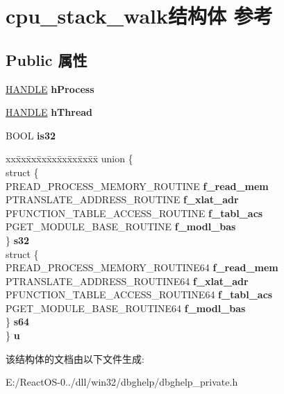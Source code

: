 \hypertarget{structcpu__stack__walk}{}\section{cpu\+\_\+stack\+\_\+walk结构体 参考}
\label{structcpu__stack__walk}
\subsection*{Public 属性}
\begin{DoxyCompactItemize}
\item 
\mbox{\label{structcpu__stack__walk_a3cef9f31d36237260c739c8983b76a48}} 
\hyperlink{interfacevoid}{H\+A\+N\+D\+LE} {\bfseries h\+Process}
\item 
\mbox{\label{structcpu__stack__walk_afe2026d8ae221bf72e8b1f0e31be3b79}} 
\hyperlink{interfacevoid}{H\+A\+N\+D\+LE} {\bfseries h\+Thread}
\item 
\mbox{\label{structcpu__stack__walk_adaa96730dfcb91526c6014dffc41317d}} 
B\+O\+OL {\bfseries is32}
\item 
\mbox{\label{structcpu__stack__walk_a3bf1ecdc96ffb6f53e4769bec6cd9d11}} 
\begin{tabbing}
xx\=xx\=xx\=xx\=xx\=xx\=xx\=xx\=xx\=\kill
union \{\\
\>struct \{\\
\>\>PREAD\_PROCESS\_MEMORY\_ROUTINE {\bfseries f\_read\_mem}\\
\>\>PTRANSLATE\_ADDRESS\_ROUTINE {\bfseries f\_xlat\_adr}\\
\>\>PFUNCTION\_TABLE\_ACCESS\_ROUTINE {\bfseries f\_tabl\_acs}\\
\>\>PGET\_MODULE\_BASE\_ROUTINE {\bfseries f\_modl\_bas}\\
\>\} {\bfseries s32}\\
\>struct \{\\
\>\>PREAD\_PROCESS\_MEMORY\_ROUTINE64 {\bfseries f\_read\_mem}\\
\>\>PTRANSLATE\_ADDRESS\_ROUTINE64 {\bfseries f\_xlat\_adr}\\
\>\>PFUNCTION\_TABLE\_ACCESS\_ROUTINE64 {\bfseries f\_tabl\_acs}\\
\>\>PGET\_MODULE\_BASE\_ROUTINE64 {\bfseries f\_modl\_bas}\\
\>\} {\bfseries s64}\\
\} {\bfseries u}\\

\end{tabbing}\end{DoxyCompactItemize}


该结构体的文档由以下文件生成\+:\begin{DoxyCompactItemize}
\item 
E\+:/\+React\+O\+S-\/0../dll/win32/dbghelp/dbghelp\+\_\+private.\+h\end{DoxyCompactItemize}
